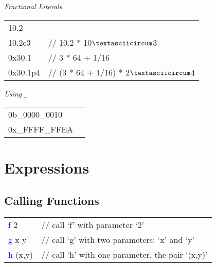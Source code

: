 \begin{table}[h!]
\begin{center}
\textit{Fractional Literals}
\end{center}
{\ttfamily\begin{tabular}{ll}
10.2 & \\
10.2e3 & \textcolor{green!50!black}{// 10.2 * 10$\textasciicircum$3} \\
0x30.1  & \textcolor{green!50!black}{// 3 * 64 + 1/16} \\
0x30.1p4  & \textcolor{green!50!black}{// (3 * 64 + 1/16) * 2$\textasciicircum$4}
\end{tabular}}
\end{table}

\begin{table}[h!]
\begin{center}
\textit{Using $\_$}
\end{center}
{\ttfamily\begin{tabular*}{\textwidth}{@{\extracolsep{\fill}}|ll|}
\hline
0b\_0000\_0010 &\\
0x\_FFFF\_FFEA &\\
\hline
\end{tabular*}}
\end{table}

\newpage
\section{Expressions}

\subsection*{Calling Functions}
\begin{table}[h!]
{\ttfamily\begin{tabular}{ll}
\textcolor{blue}{f} 2 & \textcolor{green!50!black}{// call `f' with parameter `2'} \\
\textcolor{blue}{g} x y & \textcolor{green!50!black}{// call `g' with two parameters: `x' and `y'} \\
\textcolor{blue}{h} (x,y) & \textcolor{green!50!black}{// call `h' with one parameter,  the pair `(x,y)'} \\
\end{tabular}}
\end{table}

